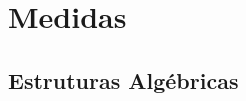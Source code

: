 \chapter{Medidas}
\lipsum[1-2]  %
\section{Estruturas Algébricas}
\hereditaryCollection
\ringOfSets
\sigmaRing
\algebraOfSets
\sigmaAlgebra
\measurableSpace
\generatedSigmaAlgebra
\topology
\topologicalSpace
\borelSigmaAlgebra
\cartesianProduct
\projection
\productSigmaAlgebra
\countablyAdditiveFunction
\countablySubadditiveFunction
\monotonicFunction
\preMeasure
\measure
\measureSpace
\nullSet
\almostEverywhere
\completeMeasureSpace
\outerMeasure
\finiteMeasure
\sigmaFiniteMeasure